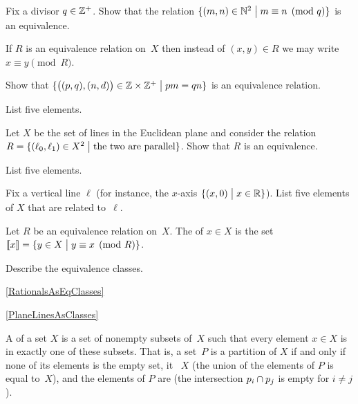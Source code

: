 \documentclass{ibl}
\begin{document}
\begin{ex}
Fix a divisor $q\in\mathbb{Z}^+$.
Show that the relation 
$\{(m,n)\in\mathbb{N}^2 \bigm| m\equiv n\pmod q\}$  
is an equivalence.
\end{ex}

\begin{df}
If $R$ is an equivalence relation on~$X$ then instead of $(x,y)\in R$
we may write $x\equiv y\pmod R$.  
\end{df}

\begin{ex} \label{RationalsAsEqClasses}
\begin{exes}
\item Show that 
$\{\big((p,q),(n,d)\big)\in \mathbb{Z}\times\mathbb{Z}^+ \bigm| pm=qn\}$
is an equivalence relation.
\item List five elements.
\end{exes}
\end{ex}

\begin{ex} \label{PlaneLinesAsClasses}
\begin{exes}
\item Let $X$ be the set of lines in the Euclidean plane and consider
the relation
$R=\{(\ell_0,\ell_1)\in X^2 \bigm| \text{the two are parallel}\}$. 
Show that $R$ is an equivalence.
\item List five elements.
\item Fix a vertical line $\ell$ (for instance, the $x$-axis 
  $\{(x,0) \bigm| x\in\mathbb{R}\}$).
  List five elements of $X$ that are related to~$\ell$.
\end{exes}
\end{ex}

\begin{df}
Let $R$ be an equivalence relation on~$X$.
The  of $x\in X$ is the set
$\llbracket x \rrbracket=\{y\in X \bigm| y\equiv x\pmod R\}$.   
\end{df}

\begin{ex} Describe the equivalence classes.
\begin{exes}
\item \cref{RationalsAsEqClasses}
\item \cref{PlaneLinesAsClasses}
\end{exes}
\end{ex}

\begin{df}
A  of a set $X$ is a 
set of nonempty subsets of~$X$ such that every element $x\in X$ 
is in exactly one of these subsets.
That is, a set~$P$ is a partition of $X$ if and only if 
none of its elements is the empty set,
it ~$X$
(the union of the elements of $P$ is equal to~$X$),
and the elements of $P$ are 
(the intersection $p_i\cap p_j$ is empty for $i\neq j$).
\end{df}
\end{document}
